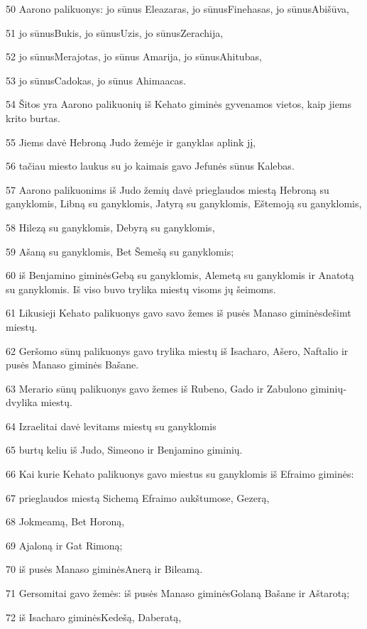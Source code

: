 \par 50 Aarono palikuonys: jo sūnus­ Eleazaras, jo sūnus­Finehasas, jo sūnus­Abišūva, 
\par 51 jo sūnus­Bukis, jo sūnus­Uzis, jo sūnus­Zerachija, 
\par 52 jo sūnus­Merajotas, jo sūnus­ Amarija, jo sūnus­Ahitubas, 
\par 53 jo sūnus­Cadokas, jo sūnus­ Ahimaacas. 
\par 54 Šitos yra Aarono palikuonių iš Kehato giminės gyvenamos vietos, kaip jiems krito burtas. 
\par 55 Jiems davė Hebroną Judo žemėje ir ganyklas aplink jį, 
\par 56 tačiau miesto laukus su jo kaimais gavo Jefunės sūnus Kalebas. 
\par 57 Aarono palikuonims iš Judo žemių davė prieglaudos miestą Hebroną su ganyklomis, Libną su ganyklomis, Jatyrą su ganyklomis, Eštemoją su ganyklomis, 
\par 58 Hilezą su ganyklomis, Debyrą su ganyklomis, 
\par 59 Ašaną su ganyklomis, Bet Šemešą su ganyklomis; 
\par 60 iš Benjamino giminės­Gebą su ganyklomis, Alemetą su ganyklomis ir Anatotą su ganyklomis. Iš viso buvo trylika miestų visoms jų šeimoms. 
\par 61 Likusieji Kehato palikuonys gavo savo žemes iš pusės Manaso giminės­dešimt miestų. 
\par 62 Geršomo sūnų palikuonys gavo trylika miestų iš Isacharo, Ašero, Naftalio ir pusės Manaso giminės Bašane. 
\par 63 Merario sūnų palikuonys gavo žemes iš Rubeno, Gado ir Zabulono giminių­dvylika miestų. 
\par 64 Izraelitai davė levitams miestų su ganyklomis 
\par 65 burtų keliu iš Judo, Simeono ir Benjamino giminių. 
\par 66 Kai kurie Kehato palikuonys gavo miestus su ganyklomis iš Efraimo giminės: 
\par 67 prieglaudos miestą Sichemą Efraimo aukštumose, Gezerą, 
\par 68 Jokmeamą, Bet Horoną, 
\par 69 Ajaloną ir Gat Rimoną; 
\par 70 iš pusės Manaso giminės­Anerą ir Bileamą. 
\par 71 Gersomitai gavo žemės: iš pusės Manaso giminės­Golaną Bašane ir Aštarotą; 
\par 72 iš Isacharo giminės­Kedešą, Daberatą, 
